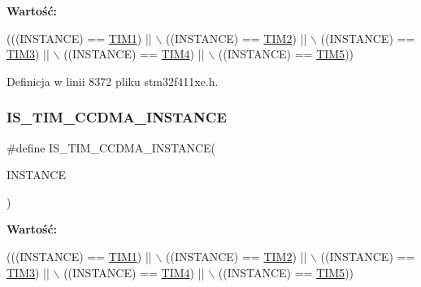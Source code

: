 {\bfseries Wartość\+:}
\begin{DoxyCode}
(((INSTANCE) == \hyperlink{group___peripheral__declaration_ga2e87451fea8dc9380056d3cfc5ed81fb}{TIM1}) || \(\backslash\)
                                       ((INSTANCE) == \hyperlink{group___peripheral__declaration_ga3cfac9f2e43673f790f8668d48b4b92b}{TIM2}) || \(\backslash\)
                                       ((INSTANCE) == \hyperlink{group___peripheral__declaration_ga61ee4c391385607d7af432b63905fcc9}{TIM3}) || \(\backslash\)
                                       ((INSTANCE) == \hyperlink{group___peripheral__declaration_ga91a09bad8bdc7a1cb3d85cf49c94c8ec}{TIM4}) || \(\backslash\)
                                       ((INSTANCE) == \hyperlink{group___peripheral__declaration_ga5125ff6a23a2ed66e2e19bd196128c14}{TIM5}))
\end{DoxyCode}


Definicja w linii 8372 pliku stm32f411xe.\+h.

\mbox{\label{group___exported__macros_ga8111ef18a809cd882ef327399fdbfc8f}} 
\subsubsection{\texorpdfstring{I\+S\+\_\+\+T\+I\+M\+\_\+\+C\+C\+D\+M\+A\+\_\+\+I\+N\+S\+T\+A\+N\+CE}{IS\_TIM\_CCDMA\_INSTANCE}}
{\footnotesize\ttfamily \#define I\+S\+\_\+\+T\+I\+M\+\_\+\+C\+C\+D\+M\+A\+\_\+\+I\+N\+S\+T\+A\+N\+CE(\begin{DoxyParamCaption}\item[{}]{I\+N\+S\+T\+A\+N\+CE }\end{DoxyParamCaption})}

{\bfseries Wartość\+:}
\begin{DoxyCode}
(((INSTANCE) == \hyperlink{group___peripheral__declaration_ga2e87451fea8dc9380056d3cfc5ed81fb}{TIM1}) || \(\backslash\)
                                          ((INSTANCE) == \hyperlink{group___peripheral__declaration_ga3cfac9f2e43673f790f8668d48b4b92b}{TIM2}) || \(\backslash\)
                                          ((INSTANCE) == \hyperlink{group___peripheral__declaration_ga61ee4c391385607d7af432b63905fcc9}{TIM3}) || \(\backslash\)
                                          ((INSTANCE) == \hyperlink{group___peripheral__declaration_ga91a09bad8bdc7a1cb3d85cf49c94c8ec}{TIM4}) || \(\backslash\)
                                          ((INSTANCE) == \hyperlink{group___peripheral__declaration_ga5125ff6a23a2ed66e2e19bd196128c14}{TIM5}))
\end{DoxyCode}


